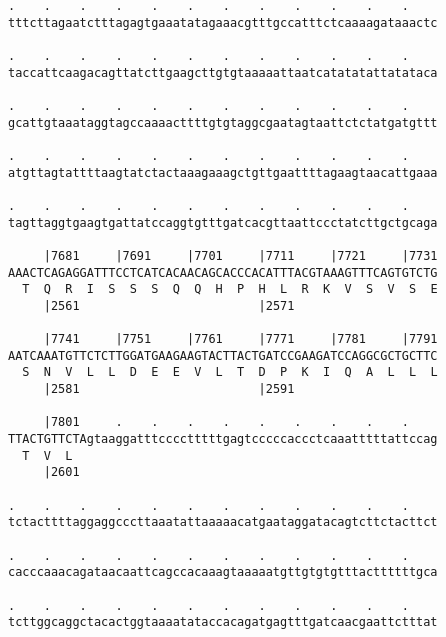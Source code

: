 \documentclass{article}
\begin{document}
\begin{Verbatim}
.    .    .    .    .    .    .    .    .    .    .    .    
tttcttagaatctttagagtgaaatatagaaacgtttgccatttctcaaaagataaactc
                                                            
.    .    .    .    .    .    .    .    .    .    .    .    
taccattcaagacagttatcttgaagcttgtgtaaaaattaatcatatatattatataca
                                                            
.    .    .    .    .    .    .    .    .    .    .    .    
gcattgtaaataggtagccaaaacttttgtgtaggcgaatagtaattctctatgatgttt
                                                            
.    .    .    .    .    .    .    .    .    .    .    .    
atgttagtattttaagtatctactaaagaaagctgttgaattttagaagtaacattgaaa
                                                            
.    .    .    .    .    .    .    .    .    .    .    .    
tagttaggtgaagtgattatccaggtgtttgatcacgttaattccctatcttgctgcaga
                                                            
     |7681     |7691     |7701     |7711     |7721     |7731
AAACTCAGAGGATTTCCTCATCACAACAGCACCCACATTTACGTAAAGTTTCAGTGTCTG
  T  Q  R  I  S  S  S  Q  Q  H  P  H  L  R  K  V  S  V  S  E
     |2561                         |2571                    
  
     |7741     |7751     |7761     |7771     |7781     |7791
AATCAAATGTTCTCTTGGATGAAGAAGTACTTACTGATCCGAAGATCCAGGCGCTGCTTC
  S  N  V  L  L  D  E  E  V  L  T  D  P  K  I  Q  A  L  L  L
     |2581                         |2591                    
  
     |7801     .    .    .    .    .    .    .    .    .    
TTACTGTTCTAgtaaggatttcccctttttgagtcccccaccctcaaatttttattccag
  T  V  L                                                   
     |2601                                                  
  
.    .    .    .    .    .    .    .    .    .    .    .    
tctacttttaggaggcccttaaatattaaaaacatgaataggatacagtcttctacttct
                                                            
.    .    .    .    .    .    .    .    .    .    .    .    
cacccaaacagataacaattcagccacaaagtaaaaatgttgtgtgtttacttttttgca
                                                            
.    .    .    .    .    .    .    .    .    .    .    .    
tcttggcaggctacactggtaaaatataccacagatgagtttgatcaacgaattctttat
                                                            

\end{Verbatim}
\end{document}
